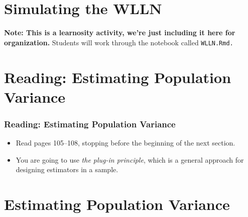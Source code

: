 \documentclass[12pt, block=fill]{beamer}
\begin{document}
\section{Simulating the WLLN}

\begin{frame}
  \textbf{Note: This is a learnosity activity, we're just including it
    here for organization.}
  Students will work through the notebook called \texttt{WLLN.Rmd.}
\end{frame}


 
\section{Reading: Estimating Population Variance}

\begin{frame}
  \frametitle{Reading: Estimating Population Variance}
  \begin{itemize}
  \item Read pages 105–108, stopping before the beginning of the
    next section. 
  \item You are going to use \textit{the plug-in principle}, which is
    a general approach for designing estimators in a sample. 
  \end{itemize} 
\end{frame}
 
\section{Estimating Population Variance}
\end{document}
